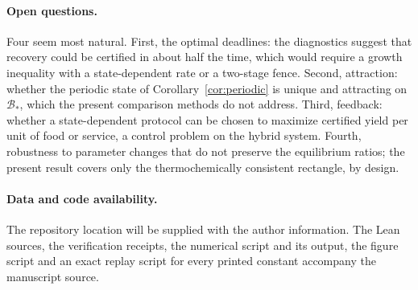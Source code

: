 \documentclass[11pt,a4paper]{article}
\newcommand{\RepositoryNote}{The repository location will be supplied with the author information.}
\theoremstyle{plain}
\theoremstyle{definition}
\theoremstyle{remark}
\newcommand{\Bstar}{\mathcal B_*}
\begin{document}
\paragraph{Open questions.}
Four seem most natural. First, the optimal deadlines: the diagnostics suggest that recovery could be certified in about half the time, which would require a growth inequality with a state-dependent rate or a two-stage fence. Second, attraction: whether the periodic state of Corollary~\ref{cor:periodic} is unique and attracting on $\Bstar$, which the present comparison methods do not address. Third, feedback: whether a state-dependent protocol can be chosen to maximize certified yield per unit of food or service, a control problem on the hybrid system. Fourth, robustness to parameter changes that do not preserve the equilibrium ratios; the present result covers only the thermochemically consistent rectangle, by design.

\paragraph{Data and code availability.}
\RepositoryNote{} The Lean sources, the verification receipts, the numerical script and its output, the figure script and an exact replay script for every printed constant accompany the manuscript source.

\appendix
\end{document}
